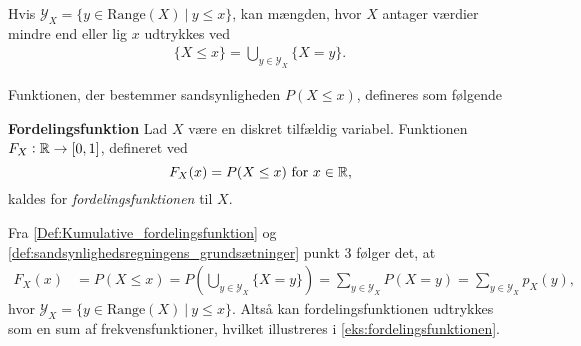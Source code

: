 Hvis $\mathcal{Y}_X = \{y \in \text{Range}(X) \ | \ y\leq x\}$, kan mængden, hvor $X$ antager værdier mindre end eller lig $x$ udtrykkes ved
\begin{align*}
    \{X \leq x\} = \bigcup_{y \in \mathcal{Y}_X} \{X = y\}. 
\end{align*}

Funktionen, der bestemmer sandsynligheden $P(X \leq x)$, defineres som følgende

\begin{minipage}\textwidth
\begin{defn}\textbf{Fordelingsfunktion}\label{Def:Kumulative_fordelingsfunktion} %
\newline
Lad $X$ være en diskret tilfældig variabel. Funktionen $F_X:\mathbb{R} \to [0,1]$, defineret ved
$$F_X(x)=P(X\leq x) \text{ for } x\in\mathbb{R},$$
kaldes for \textit{fordelingsfunktionen} til $X$.
\end{defn}
\end{minipage}

Fra \autoref{Def:Kumulative_fordelingsfunktion} og \autoref{def:sandsynlighedsregningens_grundsætninger} punkt 3 følger det, at
%
\begin{align}
    F_X(x) &= P\left(X\leq x\right)=P\left(\bigcup_{y\in \mathcal{Y}_X} \{X=y\}\right) = \sum_{y\in \mathcal{Y}_X} P(X=y) = \sum_{y\in \mathcal{Y}_X} p_X(y), \label{eq:fordelingsfunktion_som_sum_af_frekvensfunktioner}
\end{align}
hvor $\mathcal{Y}_X = \{y\in \text{Range}(X) \ | \ y\leq x\}$.
%
Altså kan fordelingsfunktionen udtrykkes som en sum af frekvensfunktioner, hvilket illustreres i \autoref{eks:fordelingsfunktionen}.


